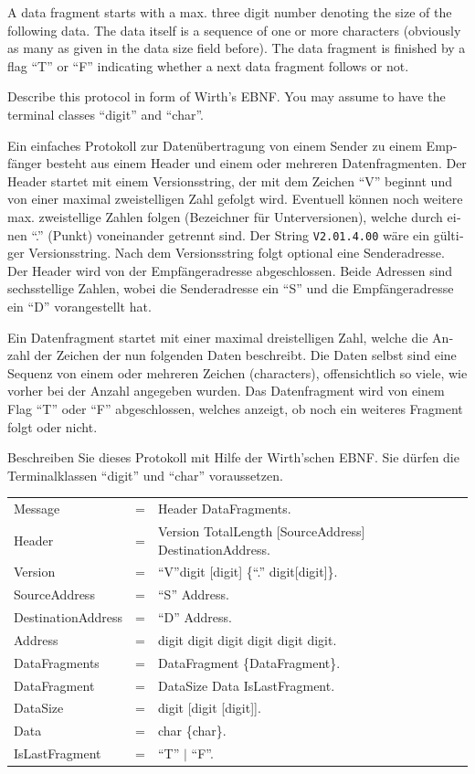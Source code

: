 \documentclass{exam}
\theoremstyle{definition}
\theoremstyle{definition}
\newenvironment{grammar}
	{\begin{tabular}[b]{lcl}}
	{\end{tabular}}
\begin{document}
\begin{questions}
A data fragment starts with a max. three digit number denoting the size of the following data. The data itself is a sequence of one or more characters (obviously as many as given in the data size field before). The data fragment is finished by a flag ``T'' or ``F'' indicating whether a next data fragment follows or not.

Describe this protocol in form of Wirth's EBNF. You may assume to have the terminal classes ``digit'' and ``char''.

\begin{otherlanguage}{german}
Ein einfaches Protokoll zur Datenübertragung von einem Sender zu einem Empfänger besteht aus einem Header und einem oder mehreren Datenfragmenten. Der Header startet mit einem Versionsstring, der mit dem Zeichen ``V'' beginnt und von einer maximal zweistelligen Zahl gefolgt wird. Eventuell können noch weitere max. zweistellige Zahlen folgen (Bezeichner für Unterversionen), welche durch einen ``.'' (Punkt) voneinander getrennt sind. Der String {\tt V2.01.4.00} wäre ein gültiger Versionsstring. Nach dem Versionsstring folgt optional eine Senderadresse. Der Header wird von der Empfängeradresse abgeschlossen. Beide Adressen sind sechsstellige Zahlen, wobei die Senderadresse ein ``S'' und die Empfängeradresse ein ``D'' vorangestellt hat.

Ein Datenfragment startet mit einer maximal dreistelligen Zahl, welche die Anzahl der Zeichen der nun folgenden Daten beschreibt. Die Daten selbst sind eine Sequenz von einem oder mehreren Zeichen (characters), offensichtlich so viele, wie vorher bei der Anzahl angegeben wurden. Das Datenfragment wird von einem Flag ``T'' oder ``F'' abgeschlossen, welches anzeigt, ob noch ein weiteres Fragment folgt oder nicht.

Beschreiben Sie dieses Protokoll mit Hilfe der Wirth'schen EBNF. Sie dürfen die Terminalklassen ``digit'' und ``char'' voraussetzen.
\end{otherlanguage}

\begin{solution}

	\begin{grammar}
		Message & = & Header DataFragments. \\
		Header &=& Version TotalLength [SourceAddress] DestinationAddress.\\
		Version &=& ``V''digit [digit] \{``.'' digit[digit]\}. \\
		SourceAddress &=& ``S'' Address. \\
		DestinationAddress &=& ``D'' Address. \\
		Address &=& digit digit digit digit digit digit. \\
		DataFragments &=& DataFragment \{DataFragment\}.\\
		DataFragment &=& DataSize Data IsLastFragment. \\
		DataSize &=& digit [digit [digit]]. \\
		Data &=& char \{char\}. \\
		IsLastFragment &=& ``T'' $|$ ``F''.
	\end{grammar}
\end{solution}


\end{questions}
\end{document}
